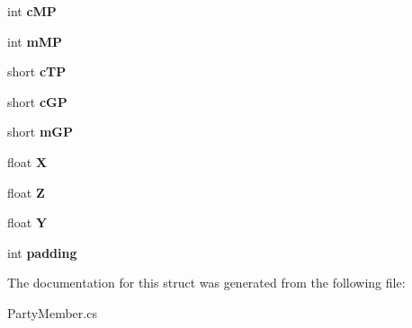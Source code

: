 \begin{DoxyCompactItemize}
\item 
\hypertarget{structffxivlib_1_1_party_member_1_1_p_a_r_t_y_m_e_m_b_e_r_i_n_f_o_a43d93e11b5dcabde1ebd4ec56c415f0e}{int {\bfseries c\-M\-P}}\label{structffxivlib_1_1_party_member_1_1_p_a_r_t_y_m_e_m_b_e_r_i_n_f_o_a43d93e11b5dcabde1ebd4ec56c415f0e}

\item 
\hypertarget{structffxivlib_1_1_party_member_1_1_p_a_r_t_y_m_e_m_b_e_r_i_n_f_o_ab45aa3bf2c4afd3991d11998154a3e11}{int {\bfseries m\-M\-P}}\label{structffxivlib_1_1_party_member_1_1_p_a_r_t_y_m_e_m_b_e_r_i_n_f_o_ab45aa3bf2c4afd3991d11998154a3e11}

\item 
\hypertarget{structffxivlib_1_1_party_member_1_1_p_a_r_t_y_m_e_m_b_e_r_i_n_f_o_a1c155a0c2169a8de7954c92dbf7ceb3c}{short {\bfseries c\-T\-P}}\label{structffxivlib_1_1_party_member_1_1_p_a_r_t_y_m_e_m_b_e_r_i_n_f_o_a1c155a0c2169a8de7954c92dbf7ceb3c}

\item 
\hypertarget{structffxivlib_1_1_party_member_1_1_p_a_r_t_y_m_e_m_b_e_r_i_n_f_o_adb063ab37768a38433ce89b80104e7b4}{short {\bfseries c\-G\-P}}\label{structffxivlib_1_1_party_member_1_1_p_a_r_t_y_m_e_m_b_e_r_i_n_f_o_adb063ab37768a38433ce89b80104e7b4}

\item 
\hypertarget{structffxivlib_1_1_party_member_1_1_p_a_r_t_y_m_e_m_b_e_r_i_n_f_o_a8bb33e0c66e5477b0dc1553c33da65c9}{short {\bfseries m\-G\-P}}\label{structffxivlib_1_1_party_member_1_1_p_a_r_t_y_m_e_m_b_e_r_i_n_f_o_a8bb33e0c66e5477b0dc1553c33da65c9}

\item 
\hypertarget{structffxivlib_1_1_party_member_1_1_p_a_r_t_y_m_e_m_b_e_r_i_n_f_o_a3fb2b0e1d689bff2f014f3a5c62c1b10}{float {\bfseries X}}\label{structffxivlib_1_1_party_member_1_1_p_a_r_t_y_m_e_m_b_e_r_i_n_f_o_a3fb2b0e1d689bff2f014f3a5c62c1b10}

\item 
\hypertarget{structffxivlib_1_1_party_member_1_1_p_a_r_t_y_m_e_m_b_e_r_i_n_f_o_a369a848b2aebd5fe73681193669aa2c5}{float {\bfseries Z}}\label{structffxivlib_1_1_party_member_1_1_p_a_r_t_y_m_e_m_b_e_r_i_n_f_o_a369a848b2aebd5fe73681193669aa2c5}

\item 
\hypertarget{structffxivlib_1_1_party_member_1_1_p_a_r_t_y_m_e_m_b_e_r_i_n_f_o_aa6de8771062f75d37ace78b480b2f981}{float {\bfseries Y}}\label{structffxivlib_1_1_party_member_1_1_p_a_r_t_y_m_e_m_b_e_r_i_n_f_o_aa6de8771062f75d37ace78b480b2f981}

\item 
\hypertarget{structffxivlib_1_1_party_member_1_1_p_a_r_t_y_m_e_m_b_e_r_i_n_f_o_a469840cdac04937ef2b9010b382d6f18}{int {\bfseries padding}}\label{structffxivlib_1_1_party_member_1_1_p_a_r_t_y_m_e_m_b_e_r_i_n_f_o_a469840cdac04937ef2b9010b382d6f18}

\end{DoxyCompactItemize}


The documentation for this struct was generated from the following file\-:\begin{DoxyCompactItemize}
\item 
Party\-Member.\-cs\end{DoxyCompactItemize}

